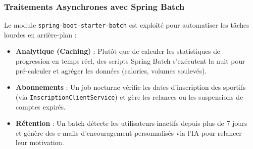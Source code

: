 \subsubsection{Traitements Asynchrones avec Spring Batch}
Le module \texttt{spring-boot-starter-batch} est exploité pour automatiser les tâches lourdes en arrière-plan :
\begin{itemize}
    \item \textbf{Analytique (Caching)} : Plutôt que de calculer les statistiques de progression en temps réel, des scripts Spring Batch s'exécutent la nuit pour pré-calculer et agréger les données (calories, volumes soulevés).
    \item \textbf{Abonnements} : Un job nocturne vérifie les dates d'inscription des sportifs (via \texttt{InscriptionClientService}) et gère les relances ou les suspensions de comptes expirés.
    \item \textbf{Rétention} : Un batch détecte les utilisateurs inactifs depuis plus de 7 jours et génère des e-mails d'encouragement personnalisés via l'IA pour relancer leur motivation.
\end{itemize}


